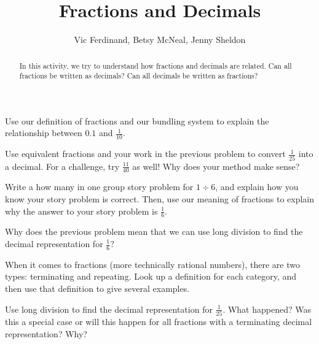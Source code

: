 \documentclass[noauthor, nooutcomes]{ximera}
\title{Fractions and Decimals}
\author{Vic Ferdinand, Betsy McNeal, Jenny Sheldon}
\begin{document}
\begin{abstract} 
In this activity, we try to understand how fractions and decimals are related.  Can all fractions be written as decimals?  Can all decimals be written as fractions?
\end{abstract}
\maketitle



\begin{problem}
Use our definition of fractions and our bundling system to explain the relationship between $0.1$ and $\frac{1}{10}$.
\end{problem}


\begin{problem}
Use equivalent fractions and your work in the previous problem to convert $\frac{1}{25}$ into a decimal. For a challenge, try $\frac{11}{40}$ as well! Why does your method make sense?
\end{problem}




\begin{problem}
Write a how many in one group story problem for $1 \div 6$, and explain how you know your story problem is correct. Then, use our meaning of fractions to explain why the answer to your story problem is $\frac{1}{6}$.

\end{problem}

\begin{problem}
Why does the previous problem mean that we can use long division to find the decimal representation for $\frac{1}{6}$?
\end{problem}


\begin{problem}
When it comes to fractions (more technically rational numbers), there are two types: terminating and repeating. Look up a definition for each category, and then use that definition to give several examples.

\end{problem}



\begin{problem}
Use long division to find the decimal representation for $\frac{1}{25}$. What happened? Was this a special case or will this happen for all fractions with a terminating decimal representation? Why?
\end{problem}
\end{document}

